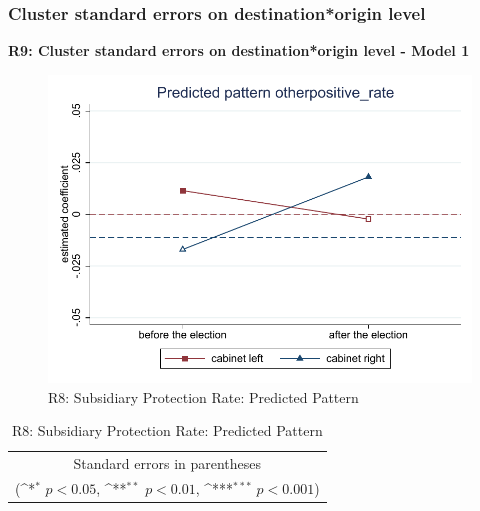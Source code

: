 \documentclass[10pt,a4paper]{scrartcl}
\begin{document}


\clearpage
\FloatBarrier
\subsubsection{Cluster standard errors on destination*origin level}
\textbf{R9: Cluster standard errors on destination*origin level - Model 1}
\begin{figure}[!ht]
	\centering
	\includegraphics[width=1\textwidth]{figures_edited/otherpositive_rate_graph1_R8.pdf}
	\caption{R8: Subsidiary Protection Rate: Predicted Pattern}
\end{figure}

\begin{table}[!ht]\centering
	\renewcommand{\arraystretch}{1.25}
	\def\sym#1{\ifmmode^{#1}\else\(^{#1}\)\fi}
	\caption{R8: Subsidiary Protection Rate: Predicted Pattern}
	\begin{tabular}{l*{2}{c}}
		\hline\hline
		
		\hline\hline
		\multicolumn{3}{c}{\footnotesize Standard errors in parentheses} \\
		\multicolumn{3}{c}{\footnotesize (\sym{*} \(p<0.05\), \sym{**} \(p<0.01\), \sym{***} \(p<0.001\))}\\
	\end{tabular}
\end{table}
\end{document}
